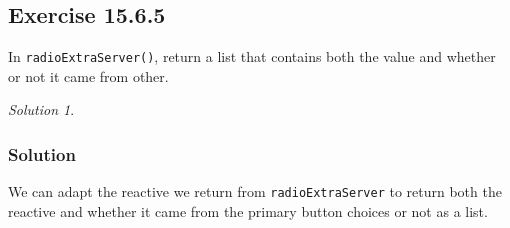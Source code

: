\documentclass[
]{book}
\newenvironment{Shaded}{\begin{snugshade}}{\end{snugshade}}
\newcommand{\AttributeTok}[1]{\textcolor[rgb]{0.77,0.63,0.00}{#1}}
\newcommand{\ConstantTok}[1]{\textcolor[rgb]{0.00,0.00,0.00}{#1}}
\newcommand{\ControlFlowTok}[1]{\textcolor[rgb]{0.13,0.29,0.53}{\textbf{#1}}}
\newcommand{\FunctionTok}[1]{\textcolor[rgb]{0.00,0.00,0.00}{#1}}
\newcommand{\NormalTok}[1]{#1}
\newcommand{\OtherTok}[1]{\textcolor[rgb]{0.56,0.35,0.01}{#1}}
\newcommand{\SpecialCharTok}[1]{\textcolor[rgb]{0.00,0.00,0.00}{#1}}
\newcommand{\StringTok}[1]{\textcolor[rgb]{0.31,0.60,0.02}{#1}}
\theoremstyle{definition}
\theoremstyle{definition}
\theoremstyle{definition}
\theoremstyle{definition}
\theoremstyle{remark}
\newtheorem*{solution}{Solution}
\begin{document}
\hypertarget{exercise-15.6.5}{%
\subsection*{Exercise 15.6.5}\label{exercise-15.6.5}}

In \texttt{radioExtraServer()}, return a list that contains both the value and whether or not it came from other.

\begin{solution}
\leavevmode

\hypertarget{solution-50}{%
\subsubsection*{Solution}\label{solution-50}}

We can adapt the reactive we return from \texttt{radioExtraServer} to return both the reactive and whether it came from the primary button choices or not as a list.

\begin{Shaded}
\end{Shaded}
\end{solution}
\end{document}
